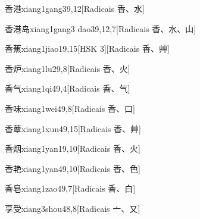 \begin{entry}{香港}{xiang1gang3}{9,12}[Radicais ⾹、⽔]
\end{entry}

\begin{entry}{香港岛}{xiang1gang3 dao3}{9,12,7}[Radicais ⾹、⽔、⼭]
\end{entry}

\begin{entry}{香蕉}{xiang1jiao1}{9,15}[HSK 3][Radicais ⾹、⾋]
\end{entry}

\begin{entry}{香炉}{xiang1lu2}{9,8}[Radicais ⾹、⽕]
\end{entry}

\begin{entry}{香气}{xiang1qi4}{9,4}[Radicais ⾹、⽓]
\end{entry}

\begin{entry}{香味}{xiang1wei4}{9,8}[Radicais ⾹、⼝]
\end{entry}

\begin{entry}{香蕈}{xiang1xun4}{9,15}[Radicais ⾹、⾋]
\end{entry}

\begin{entry}{香烟}{xiang1yan1}{9,10}[Radicais ⾹、⽕]
\end{entry}

\begin{entry}{香艳}{xiang1yan4}{9,10}[Radicais ⾹、⾊]
\end{entry}

\begin{entry}{香皂}{xiang1zao4}{9,7}[Radicais ⾹、⽩]
\end{entry}

\begin{entry}{享受}{xiang3shou4}{8,8}[Radicais ⼇、⼜]
\end{entry}

